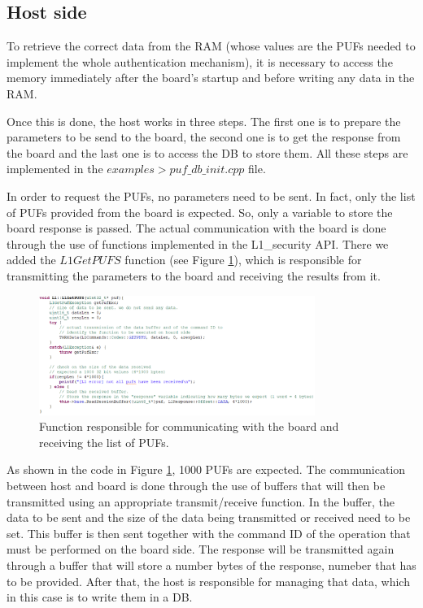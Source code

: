 \subsection{Host side}

To retrieve the correct data from the RAM (whose values are the PUFs needed to implement the whole authentication mechanism), it is necessary to access the memory immediately after the board's startup and before writing any data in the RAM. 

Once this is done, the host works in three steps. The first one is to prepare the parameters to be send to the board, the second one is to get the response from the board and the last one is to access the DB to store them. All these steps are implemented in the $examples > puf\_db\_init.cpp$ file.

In order to request the PUFs, no parameters need to be sent. In fact, only the list of PUFs provided from the board is expected. So, only a variable to store the board response is passed.
The actual communication with the board is done through the use of functions implemented in the L1\_security API. There we added the $L1GetPUFS$ function (see Figure \ref{fig:L1GetPUFS}), which is responsible for transmitting the parameters to the board and receiving the results from it.

\begin{figure}[h!]
	\vspace{0.5cm}
	\includegraphics[width = 0.8\textwidth]{images/L1GetPUFS.png}
	\caption{Function responsible for communicating with the board and receiving the list of PUFs. }
	\label{fig:L1GetPUFS}
\end{figure}

As shown in the code in Figure \ref{fig:L1GetPUFS}, 1000 PUFs are expected. The communication between host and board is done through the use of buffers that will then be transmitted using an appropriate transmit/receive function. In the buffer, the data to be sent and the size of the data being transmitted or received need to be set. This buffer is then sent together with the command ID of the operation that must be performed on the board side. The response will be transmitted again through a buffer that will store a number bytes of the response, numeber that has to be provided. After that, the host is responsible for managing that data, which in this case is to write them in a DB.

